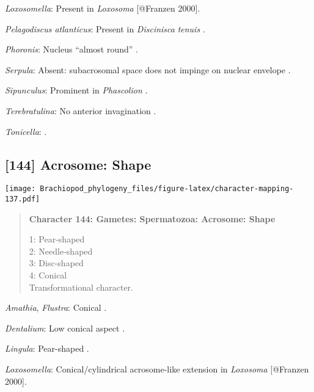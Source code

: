 \documentclass[openany]{book}
\theoremstyle{definition}
\theoremstyle{definition}
\theoremstyle{definition}
\theoremstyle{remark}
\begin{document}
\hypertarget{Loxosomella-coding-143}{}
\emph{Loxosomella}: Present in \emph{Loxosoma} {[}@Franzen 2000{]}.

\hypertarget{Pelagodiscus_atlanticus-coding-143}{}
\emph{Pelagodiscus atlanticus}: Present in \emph{Discinisca}
\emph{tenuis} \citep{Hodgson1994Ultrastructureof}.

\hypertarget{Phoronis-coding-143}{}
\emph{Phoronis}: Nucleus ``almost round''
\citep{Reunov2004Ultrastructuralstudy}.

\hypertarget{Serpula-coding-143}{}
\emph{Serpula}: Absent: subacrosomal space does not impinge on nuclear
envelope \citep{Gherardi2011}.

\hypertarget{Sipunculus-coding-143}{}
\emph{Sipunculus}: Prominent in \emph{Phascolion} \citep{Rice1993}.

\hypertarget{Terebratulina-coding-143}{}
\emph{Terebratulina}: No anterior invagination
\citep{Hodgson1994Ultrastructureof}.

\hypertarget{Tonicella-coding-143}{}
\emph{Tonicella}: \citet{BucklandNicks1988}.

\subsection*{{[}144{]} Acrosome: Shape}\label{acrosome-shape}

\texttt{[image: Brachiopod\_phylogeny\_files/figure-latex/character-mapping-137.pdf]}

\begin{quote}
\textbf{Character 144: Gametes: Spermatozoa: Acrosome: Shape}

1: Pear-shaped\\
2: Needle-shaped\\
3: Disc-shaped\\
4: Conical\\
Transformational character.
\end{quote}

\hypertarget{Amathia-coding-144}{}
\emph{Amathia}, \emph{Flustra}: Conical \citep[in
\emph{Tubulipora};][]{Franzen1984}.

\hypertarget{Dentalium-coding-144}{}
\emph{Dentalium}: Low conical aspect \citep{DufresneDube1983}.

\hypertarget{Lingula-coding-144}{}
\emph{Lingula}: Pear-shaped \citep{Fukumoto2003Theacrosome}.

\hypertarget{Loxosomella-coding-144}{}
\emph{Loxosomella}: Conical/cylindrical acrosome-like extension in
\emph{Loxosoma} {[}@Franzen 2000{]}.
\end{document}
